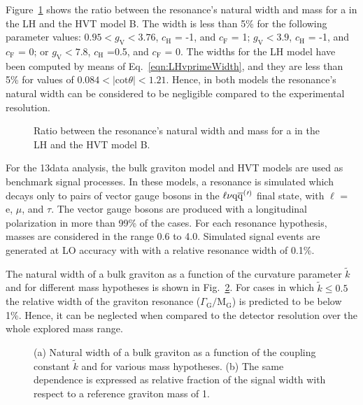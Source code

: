 Figure~\ref{fig:WHmodelsWidth} shows the ratio between the resonance's natural width and mass for a \Wpr in the LH and the HVT model B.
The width is less than 5\% for the following parameter values:
$0.95 < g_\mathrm{V} < 3.76$, $c_\mathrm{H}$ = -1, and $c_\mathrm{F}$ = 1;
$g_\mathrm{V} < 3.9$, $c_\mathrm{H}$ = -1, and $c_\mathrm{F}$ = 0;
or $g_\mathrm{V} < 7.8$, $c_\mathrm{H}$ =0.5, and $c_\mathrm{F}$ = 0.
The widths for the LH model have been computed by means of Eq.~\ref{eqn:LHvprimeWidth}, and they are less than 5\%
for values of $0.084 < |\mathrm{cot}\theta| < 1.21$. Hence, in both models the resonance's natural width can be considered to be negligible compared to the experimental resolution.\\

\begin{figure}[!htb]
\centering
{}
\caption{Ratio between the resonance's natural width and mass for a \Wpr in the LH and the HVT model B.}
\label{fig:WHmodelsWidth}
\end{figure}

For the 13\TeV data analysis, the bulk graviton model and HVT models are used as benchmark signal processes.
In these models, a resonance is simulated which decays only to pairs of vector gauge bosons in the $\ell\nu\mathrm{q}\overline{\mathrm{q}}^({}'^){}$ final state, with $\ell$ = e, $\mu$, and $\tau$.
The vector gauge bosons are produced with a longitudinal polarization in more than 99\% of the cases.
For each resonance hypothesis, masses are considered in the range 0.6 to 4.0\TeV.
Simulated signal events are generated at LO accuracy with \amcatnlo{} with a relative resonance width of 0.1\%.

The natural width of a bulk graviton as a function of the curvature parameter $\tilde{k}$ and for different mass hypotheses is shown in Fig.~\ref{fig:bulkGwidth}.
For cases in which $\tilde{k} \leq 0.5$ the relative width of the graviton resonance ($\Gamma_\mathrm{G}/\mathrm{M}_\mathrm{G}$)
is predicted to be below 1\%. Hence, it can be neglected when compared to the detector resolution over the whole explored mass range.

\begin{figure}[!htb]
\centering
{}
\caption{(a) Natural width of a bulk graviton as a function of the coupling constant $\tilde{k}$ and for various mass hypotheses. (b) The same dependence is expressed as relative fraction of the signal width with respect to a reference graviton mass of 1\TeV.}
\label{fig:bulkGwidth}
\end{figure}

